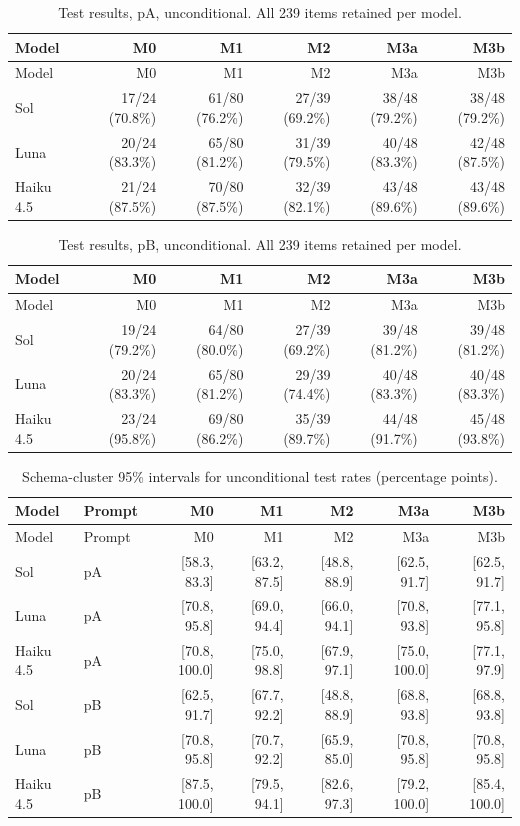 \begingroup\small\setlength{\tabcolsep}{4pt}
\begin{longtable}{lrrrrr}
\caption{Test results, pA, unconditional. All 239 items retained per model.}\\
\toprule
Model & M0 & M1 & M2 & M3a & M3b \\
\midrule\endfirsthead
\toprule
Model & M0 & M1 & M2 & M3a & M3b \\
\midrule\endhead
\bottomrule\endfoot
Sol & 17/24 (70.8\%) & 61/80 (76.2\%) & 27/39 (69.2\%) & 38/48 (79.2\%) & 38/48 (79.2\%) \\
Luna & 20/24 (83.3\%) & 65/80 (81.2\%) & 31/39 (79.5\%) & 40/48 (83.3\%) & 42/48 (87.5\%) \\
Haiku 4.5 & 21/24 (87.5\%) & 70/80 (87.5\%) & 32/39 (82.1\%) & 43/48 (89.6\%) & 43/48 (89.6\%) \\
\end{longtable}\endgroup


\begingroup\small\setlength{\tabcolsep}{4pt}
\begin{longtable}{lrrrrr}
\caption{Test results, pB, unconditional. All 239 items retained per model.}\\
\toprule
Model & M0 & M1 & M2 & M3a & M3b \\
\midrule\endfirsthead
\toprule
Model & M0 & M1 & M2 & M3a & M3b \\
\midrule\endhead
\bottomrule\endfoot
Sol & 19/24 (79.2\%) & 64/80 (80.0\%) & 27/39 (69.2\%) & 39/48 (81.2\%) & 39/48 (81.2\%) \\
Luna & 20/24 (83.3\%) & 65/80 (81.2\%) & 29/39 (74.4\%) & 40/48 (83.3\%) & 40/48 (83.3\%) \\
Haiku 4.5 & 23/24 (95.8\%) & 69/80 (86.2\%) & 35/39 (89.7\%) & 44/48 (91.7\%) & 45/48 (93.8\%) \\
\end{longtable}\endgroup


\begingroup\small\setlength{\tabcolsep}{4pt}
\begin{longtable}{llrrrrr}
\caption{Schema-cluster 95\% intervals for unconditional test rates (percentage points).}\\
\toprule
Model & Prompt & M0 & M1 & M2 & M3a & M3b \\
\midrule\endfirsthead
\toprule
Model & Prompt & M0 & M1 & M2 & M3a & M3b \\
\midrule\endhead
\bottomrule\endfoot
Sol & pA & [58.3, 83.3] & [63.2, 87.5] & [48.8, 88.9] & [62.5, 91.7] & [62.5, 91.7] \\
Luna & pA & [70.8, 95.8] & [69.0, 94.4] & [66.0, 94.1] & [70.8, 93.8] & [77.1, 95.8] \\
Haiku 4.5 & pA & [70.8, 100.0] & [75.0, 98.8] & [67.9, 97.1] & [75.0, 100.0] & [77.1, 97.9] \\
Sol & pB & [62.5, 91.7] & [67.7, 92.2] & [48.8, 88.9] & [68.8, 93.8] & [68.8, 93.8] \\
Luna & pB & [70.8, 95.8] & [70.7, 92.2] & [65.9, 85.0] & [70.8, 95.8] & [70.8, 95.8] \\
Haiku 4.5 & pB & [87.5, 100.0] & [79.5, 94.1] & [82.6, 97.3] & [79.2, 100.0] & [85.4, 100.0] \\
\end{longtable}\endgroup


